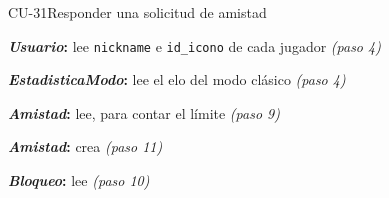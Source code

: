 \begin{fichacu}{CU-31}{Responder una solicitud de amistad}
{\begin{cudatos}
      \item \textbf{\textit{Usuario}:} lee \texttt{nickname} e \texttt{id\_\allowbreak{}icono} de cada jugador \textit{(paso 4)}
      \item \textbf{\textit{EstadisticaModo}:} lee el elo del modo clásico \textit{(paso 4)}
      \item \textbf{\textit{Amistad}:} lee, para contar el límite \textit{(paso 9)}
      \item \textbf{\textit{Amistad}:} crea \textit{(paso 11)}
      \item \textbf{\textit{Bloqueo}:} lee \textit{(paso 10)}
    \end{cudatos}} \\ \hline
\end{fichacu}
\clearpage
